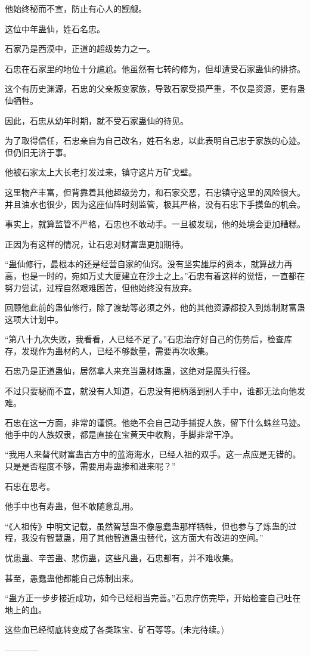 \begin{this_body}
他始终秘而不宣，防止有心人的觊觎。

这位中年蛊仙，姓石名忠。

石家乃是西漠中，正道的超级势力之一。

石忠在石家里的地位十分尴尬。他虽然有七转的修为，但却遭受石家蛊仙的排挤。

这个有历史渊源，石忠的父亲叛变家族，导致石家受损严重，不仅是资源，更有蛊仙牺牲。

因此，石忠从幼年时期，就不受石家蛊仙的待见。

为了取得信任，石忠亲自为自己改名，姓石名忠，以此表明自己忠于家族的心迹。但仍旧无济于事。

他被石家太上大长老打发过来，镇守这片万矿戈壁。

这里物产丰富，但背靠着其他超级势力，和石家交恶，石忠镇守这里的风险很大。并且油水也很少，因为这座仙阵时刻监管，极其严格，没有石忠下手摸鱼的机会。

事实上，就算监管不严格，石忠也不敢动手。一旦被发现，他的处境会更加糟糕。

正因为有这样的情况，让石忠对财富蛊更加期待。

“蛊仙修行，最根本的还是经营自家的仙窍。没有坚实雄厚的资本，就算战力再高，也是一时的，宛如万丈大厦建立在沙土之上。”石忠有着这样的觉悟，一直都在努力尝试，过程自然艰难困苦，但他始终没有放弃。

回顾他此前的蛊仙修行，除了渡劫等必须之外，他的其他资源都投入到炼制财富蛊这项大计划中。

“第八十九次失败，我看看，人已经不足了。”石忠治疗好自己的伤势后，检查库存，发现作为蛊材的人，已经不够数量，需要再次收集。

石忠乃是正道蛊仙，居然拿人来充当蛊材炼蛊，这绝对是魔头行径。

不过只要秘而不宣，就没有人知道，石忠没有把柄落到别人手中，谁都无法向他发难。

石忠在这一方面，非常的谨慎。他绝不会自己动手捕捉人族，留下什么蛛丝马迹。他手中的人族奴隶，都是直接在宝黄天中收购，手脚非常干净。

“我用人来替代财富蛊古方中的蓝海海水，已经人祖的双手。这一点应是无错的。只是是否程度不够，需要用寿蛊掺和进来呢？”

石忠在思考。

他手中也有寿蛊，但不敢随意乱用。

“《人祖传》中明文记载，虽然智慧蛊不像愚蠢蛊那样牺牲，但也参与了炼蛊的过程，我没有智慧蛊，用了其他智道蛊虫替代，这方面大有改进的空间。”

忧患蛊、辛苦蛊、悲伤蛊，这些凡蛊，石忠都有，并不难收集。

甚至，愚蠢蛊他都能自己炼制出来。

“蛊方正一步步接近成功，如今已经相当完善。”石忠疗伤完毕，开始检查自己吐在地上的血。

这些血已经彻底转变成了各类珠宝、矿石等等。(未完待续。)

------------

\end{this_body}

